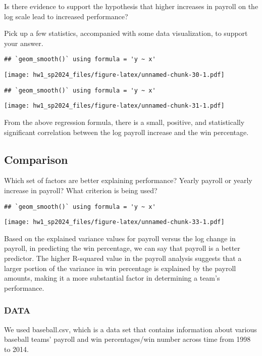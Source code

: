 \documentclass[
]{article}
\begin{document}
Is there evidence to support the hypothesis that higher increases in
payroll on the log scale lead to increased performance?

Pick up a few statistics, accompanied with some data visualization, to
support your answer.

\begin{verbatim}
## `geom_smooth()` using formula = 'y ~ x'
\end{verbatim}

\texttt{[image: hw1\_sp2024\_files/figure-latex/unnamed-chunk-30-1.pdf]}

\begin{verbatim}
## `geom_smooth()` using formula = 'y ~ x'
\end{verbatim}

\texttt{[image: hw1\_sp2024\_files/figure-latex/unnamed-chunk-31-1.pdf]}

From the above regression formula, there is a small, positive, and
statistically significant correlation between the log payroll increase
and the win percentage.

\hypertarget{comparison}{%
\subsection{Comparison}\label{comparison}}

Which set of factors are better explaining performance? Yearly payroll
or yearly increase in payroll? What criterion is being used?

\begin{verbatim}
## `geom_smooth()` using formula = 'y ~ x'
\end{verbatim}

\texttt{[image: hw1\_sp2024\_files/figure-latex/unnamed-chunk-33-1.pdf]}

Based on the explained variance values for payroll versus the log change
in payroll, in predicting the win percentage, we can say that payroll is
a better predictor. The higher R-squared value in the payroll analysis
suggests that a larger portion of the variance in win percentage is
explained by the payroll amounts, making it a more substantial factor in
determining a team's performance.

\hypertarget{data}{%
\subsubsection{DATA}\label{data}}

We used baseball.csv, which is a data set that contains information
about various baseball teams' payroll and win percentages/win number
across time from 1998 to 2014.
\end{document}
